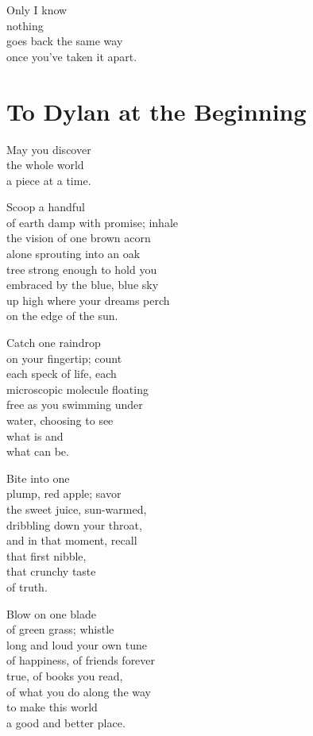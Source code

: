 \documentclass[twoside,10pt]{book}
\begin{document}
Only I know\\
nothing\\
goes back the same way\\
once you've taken it apart.


\clearpage
\section{To Dylan at the Beginning}

May you discover\\
the whole world\\
a piece at a time.

Scoop a handful\\
of earth damp with promise; inhale\\
the vision of one brown acorn\\
alone sprouting into an oak\\
tree strong enough to hold you\\
embraced by the blue, blue sky\\
up high where your dreams perch\\
on the edge of the sun.

Catch one raindrop\\
on your fingertip; count\\
each speck of life, each\\
microscopic molecule floating\\
free as you swimming under\\
water, choosing to see\\
what is and\\
what can be.

Bite into one\\
plump, red apple; savor\\
the sweet juice, sun-warmed,\\
dribbling down your throat,\\
and in that moment, recall\\
that first nibble,\\
that crunchy taste\\
of truth.

Blow on one blade\\
of green grass; whistle\\
long and loud your own tune\\
of happiness, of friends forever\\
true, of books you read,\\
of what you do along the way\\
to make this world\\
a good and better place.
\end{document}
